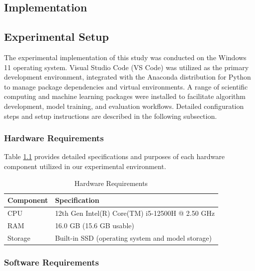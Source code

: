 \begin{ZhChapter}

    \chapter{Implementation}
    \section{Experimental Setup}
    The experimental implementation of this study was conducted on the Windows 11 operating system. Visual Studio Code (VS Code) was utilized as the primary development environment, integrated with the Anaconda distribution for Python to manage package dependencies and virtual environments. A range of scientific computing and machine learning packages were installed to facilitate algorithm development, model training, and evaluation workflows. Detailed configuration steps and setup instructions are described in the following subsection.

    \subsection{Hardware Requirements}

    Table \ref{table:hardware} provides detailed specifications and purposes of each hardware component utilized in our experimental environment.

    \begin{table}[htbp]
        \centering
        \caption{Hardware Requirements}
        \label{table:hardware}
        \begin{tabular}{|l|l|}
            \hline
            \textbf{Component} & \textbf{Specification}                            \\ \hline
            CPU                & 12th Gen Intel(R) Core(TM) i5-12500H @ 2.50 GHz   \\ \hline
            RAM                & 16.0 GB (15.6 GB usable)                          \\ \hline
            Storage            & Built-in SSD (operating system and model storage) \\ \hline
        \end{tabular}
    \end{table}

    \subsection{Software Requirements}


\end{ZhChapter}

